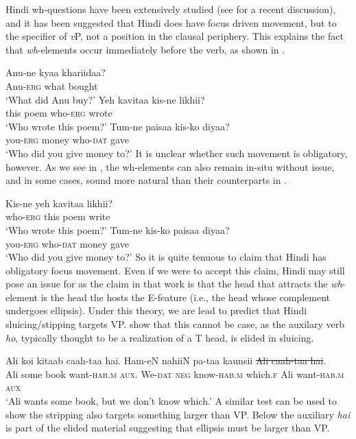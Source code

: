 \documentclass[output=paper]{langscibook}
\begin{document}
Hindi wh-questions have been extensively studied (see \citealt{dayal17} for a recent discussion), and it has been suggested that Hindi does have focus driven movement, but to the specifier of \emph{v}P, not a position in the clausal periphery. This explains the fact that \emph{wh}-elements occur immediately before the verb, as shown in .

\ea \label{maex19}
    \ea 
        \gll Anu-ne kyaa khariidaa?\\
        Anu-\textsc{erg} what bought\\
        \glt `What did Anu buy?'
    \ex 
        \gll Yeh kavitaa kis-ne likhii?\\
        this poem who-\textsc{erg} wrote\\
        \glt `Who wrote this poem?'
    \ex 
        \gll Tum-ne paisaa kis-ko diyaa?\\
        you-\textsc{erg} money who-\textsc{dat} gave\\
        \glt `Who did you give money to?'
    \z 
\z 
It is unclear whether such movement is obligatory, however. As we see in , the wh-elements can also remain in-situ without issue, and in some cases, sound more natural than their counterparts in .

\ea \label{maex20}
    \ea 
        \gll Kis-ne yeh kavitaa likhii?\\
        who-\textsc{erg} this poem write\\
        \glt `Who wrote this poem?'
    \ex 
        \gll Tum-ne kis-ko paisaa diyaa?\\
        you-\textsc{erg} who-\textsc{dat} money gave\\
        \glt `Who did you give money to?'
    \z 
\z 
So it is quite tenuous to claim that Hindi has obligatory focus movement. Even if we were to accept this claim, Hindi may still pose an issue for \cite{craenenbroeck13} as the claim in that work is that the head that attracts the \emph{wh}-element is the head the hosts the E-feature (i.e., the head whose complement undergoes ellipsis). Under this theory, we are lead to predict that Hindi sluicing/stipping targets VP. \cite{gribanova16} show that this cannot be case, as the auxilary verb \emph{ho}, typically thought to be a realization of a T head, is elided in sluicing.

\ea 
    \gll Ali koi kitaab caah-taa hai. Ham-eN nahiiN pa-taa kaunsii \sout{Ali caah-taa hai}.\\
    Ali some book want-\textsc{hab.m} \textsc{aux}. We-\textsc{dat} \textsc{neg} know-\textsc{hab.m} which.\textsc{f} {Ali want-\textsc{hab.m} \textsc{aux}}\\
    \glt `Ali wants some book, but we don't know which.' \hfill \citep[643]{gribanova16}
\z 
A similar test can be used to show the stripping also targets something larger than VP. Below the auxiliary \emph{hai} is part of the elided material suggesting that ellipsis must be larger than VP. 
\end{document}
